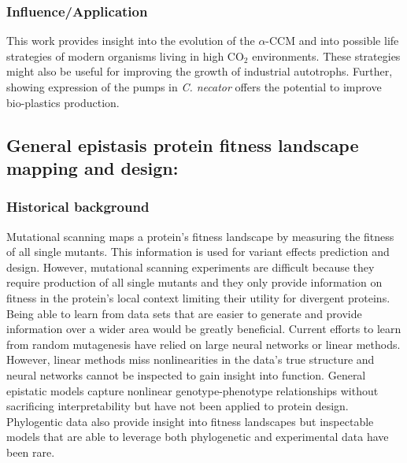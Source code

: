 \documentclass{article}
\begin{document}
\subsubsection{Influence/Application}
This work provides insight into the evolution of the $\alpha$-CCM and into possible life strategies of modern organisms living in high CO$_2$ environments.
These strategies might also be useful for improving the growth of industrial autotrophs.
Further, showing expression of the pumps in \textit{C. necator} offers the potential to improve bio-plastics production.

%
\nocite{Flamholz2022-yo}
\printbibliography[heading=none]


\subsection{General epistasis protein fitness landscape mapping and design:}
\subsubsection{Historical background}
Mutational scanning maps a protein's fitness landscape by measuring the fitness of all single mutants.
This information is used for variant effects prediction and design.
However, mutational scanning experiments are difficult because they require production of all single mutants and they only provide information on fitness in the protein's local context limiting their utility for divergent proteins.
Being able to learn from data sets that are easier to generate and provide information over a wider area would be greatly beneficial.
Current efforts to learn from random mutagenesis have relied on large neural networks or linear methods.
However, linear methods miss nonlinearities in the data's true structure and neural networks cannot be inspected to gain insight into function.
General epistatic models capture nonlinear genotype-phenotype relationships without sacrificing interpretability but have not been applied to protein design.
Phylogentic data also provide insight into fitness landscapes but inspectable models that are able to leverage both phylogenetic and experimental data have been rare.
%
\end{document}
